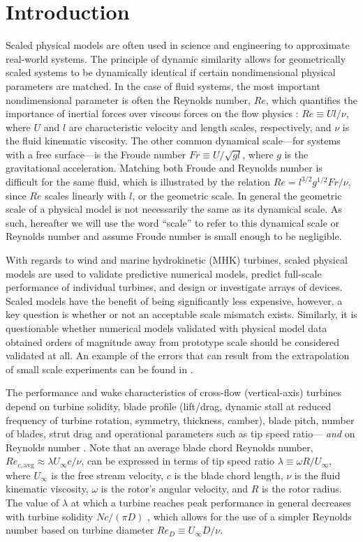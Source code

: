 \documentclass[energies,article,accept,moreauthors,pdftex,12pt,a4paper]{mdpi}
\begin{document}
\section{Introduction}

Scaled physical models are often used in science and engineering to approximate
real-world systems. The principle of dynamic similarity allows for geometrically
scaled systems to be dynamically identical if certain nondimensional physical
parameters are matched. In the case of fluid systems, the most important
nondimensional parameter is often the Reynolds number, $Re$, which quantifies
the importance of inertial forces over viscous forces on the flow physics
\cite{Acheson1990}: $Re \equiv Ul/\nu$, where $U$ and $l$ are characteristic
velocity and length scales, respectively, and $\nu$ is the fluid kinematic
viscosity. The other common dynamical scale---for systems with a free
surface---is the Froude number $Fr \equiv U/\sqrt{gl}$, where $g$ is the
gravitational acceleration. Matching both Froude and Reynolds number is
difficult for the same fluid, which is illustrated by the relation $Re = l^{3/2}
g^{1/2} Fr / \nu$, since $Re$ scales linearly with $l$, or the geometric scale.
In general the geometric scale of a physical model is not necessarily the same
as its dynamical scale. As such, hereafter we will use the word ``scale'' to
refer to this dynamical scale or Reynolds number and assume Froude number is
small enough to be negligible.

With regards to wind and marine hydrokinetic (MHK) turbines, scaled physical
models are used to validate predictive numerical models, predict full-scale
performance of individual turbines, and design or investigate arrays of devices.
Scaled models have the benefit of being significantly less expensive, however, a
key question is whether or not an acceptable scale mismatch exists. Similarly,
it is questionable whether numerical models validated with physical model data
obtained orders of magnitude away from prototype scale should be considered
validated at all. An example of the errors that can result from the
extrapolation of small scale experiments can be found in \cite{Baker1991}.

The performance and wake characteristics of cross-flow (vertical-axis) turbines
depend on turbine solidity, blade profile (lift/drag, dynamic stall at reduced
frequency of turbine rotation, symmetry, thickness, camber), blade pitch, number
of blades, strut drag and operational parameters such as tip speed ratio---{\em
    and} on Reynolds number \cite{Para2002}. Note that an average blade chord
Reynolds number, $Re_{c,\mathrm{avg}} \approx \lambda U_\infty c/ \nu$, can be
expressed in terms of tip speed ratio $\lambda \equiv \omega R/ U_\infty$, where
$U_\infty$ is the free stream velocity, $c$ is the blade chord length, $\nu$ is
the fluid kinematic viscosity, $\omega$ is the rotor's angular velocity, and $R$
is the rotor radius. The value of $\lambda$ at which a turbine reaches peak
performance in general decreases with turbine solidity $Nc/(\pi D)$
\cite{Templin1974}, which allows for the use of a simpler Reynolds number based
on turbine diameter $Re_D \equiv U_\infty D/\nu$.
\end{document}
